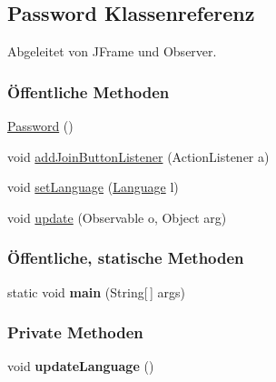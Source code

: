 \hypertarget{a00020}{\subsection{Password Klassenreferenz}
\label{a00020}
}


Abgeleitet von J\-Frame und Observer.

\subsubsection*{Öffentliche Methoden}
\begin{DoxyCompactItemize}
\item 
\hypertarget{a00020_a6648c3e6cbe9bc619346bf5995f0a73a}{\hyperlink{a00020_a6648c3e6cbe9bc619346bf5995f0a73a}{Password} ()}\label{a00020_a6648c3e6cbe9bc619346bf5995f0a73a}

\item 
void \hyperlink{a00020_a4c19f7e1cf18bb9a26458694250c5a42}{add\-Join\-Button\-Listener} (Action\-Listener a)
\item 
void \hyperlink{a00020_a9329ba7453dd661d50d2fb8024df3b2b}{set\-Language} (\hyperlink{a00015}{Language} l)
\item 
void \hyperlink{a00020_a2b67d42550fdf9ddd8f3878d0849965c}{update} (Observable o, Object arg)
\end{DoxyCompactItemize}
\subsubsection*{Öffentliche, statische Methoden}
\begin{DoxyCompactItemize}
\item 
\hypertarget{a00020_a8b260eecbaabcef8473fd87ada040682}{static void {\bfseries main} (String\mbox{[}$\,$\mbox{]} args)}\label{a00020_a8b260eecbaabcef8473fd87ada040682}

\end{DoxyCompactItemize}
\subsubsection*{Private Methoden}
\begin{DoxyCompactItemize}
\item 
\hypertarget{a00020_a74cba330cee84fa07487e12fdafe29aa}{void {\bfseries update\-Language} ()}\label{a00020_a74cba330cee84fa07487e12fdafe29aa}

\end{DoxyCompactItemize}
